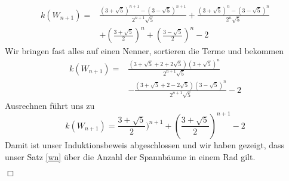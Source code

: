 \begin{equation}
\begin{aligned}
\mathit{k}(W_{n+1}) ={} & \frac{(3+\sqrt{5})^{n+1}-(3-\sqrt{5})^{n+1}}{2^{n+1}\sqrt{5}} + \frac{(3+\sqrt{5})^{n}-(3-\sqrt{5})^{n}}{2^{n}\sqrt{5}}\\
& + (\frac{3+\sqrt{5}}{2})^n+(\frac{3-\sqrt{5}}{2})^n-2
\end{aligned}
\end{equation}
Wir bringen fast alles auf einen Nenner, sortieren die Terme und bekommen
\begin{equation}
\begin{aligned}
\mathit{k}(W_{n+1}) = {}  & \frac{(3+\sqrt{5}+2+2\sqrt{5})(3+\sqrt{5})^{n}}{2^{n+1}\sqrt{5}} \\%
                        & -\frac{(3+\sqrt{5}+2-2\sqrt{5})(3-\sqrt{5})^{n}}{2^{n+1}\sqrt{5}}-2 
\end{aligned}
\end{equation}
Ausrechnen führt uns zu\\
\begin{equation}
\mathit{k}(W_{n+1}) = \frac{3+\sqrt{5}}{2})^{n+1}+(\frac{3+\sqrt{5}}{2})^{n+1}-2
\end{equation}
Damit ist unser Induktionsbeweis abgeschlossen und wir haben gezeigt, dass unser Satz \ref{wn} über die Anzahl der Spannbäume in einem Rad gilt.
\begin{flushright} $\Box$ \end{flushright} 
